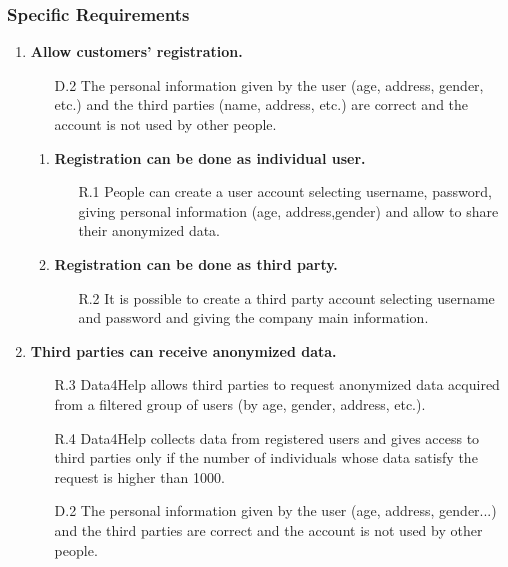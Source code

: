 \documentclass[a4paper]{article}
\begin{document}
\subsubsection{Specific Requirements}
\begin{enumerate}[label*=\bf{G.\arabic*}]
    
    \item \textbf{Allow customers’ registration.}
    \begin{enumerate}
        \item [D.2] The personal information given by the user (age, address, gender, etc.) and the third parties (name, address, etc.) are correct and the account is not used by other people. 
    \end{enumerate}
    
    \begin{enumerate}[label*=\bf{.\arabic*}]
        \item \textbf{Registration can be done as individual user.}
        \begin{enumerate}
            \item [R.1] People can create a user account selecting username, password, giving personal information (age, address,gender) and allow to share their anonymized data.
            
        \end{enumerate}
        
        \item \textbf{Registration can be done as third party.}
        \begin{enumerate}
            \item [R.2] It is possible to create a third party account selecting username and password and giving the company main information.
        \end{enumerate}
    \end{enumerate}
    
    \item \textbf{Third parties can receive anonymized data.}
            
    \begin{enumerate}
        \item [R.3] Data4Help allows third parties to request anonymized data acquired from a filtered group of users (by age, gender, address, etc.).
        \item [R.4] Data4Help collects data from registered users and gives access to third parties only if the number of individuals whose data satisfy the request is higher than 1000.
        \item [D.2] The personal information given by the user (age, address, gender...) and the third parties are correct and the account is not used by other people.
    \end{enumerate}
        

\end{enumerate}
\end{document}
